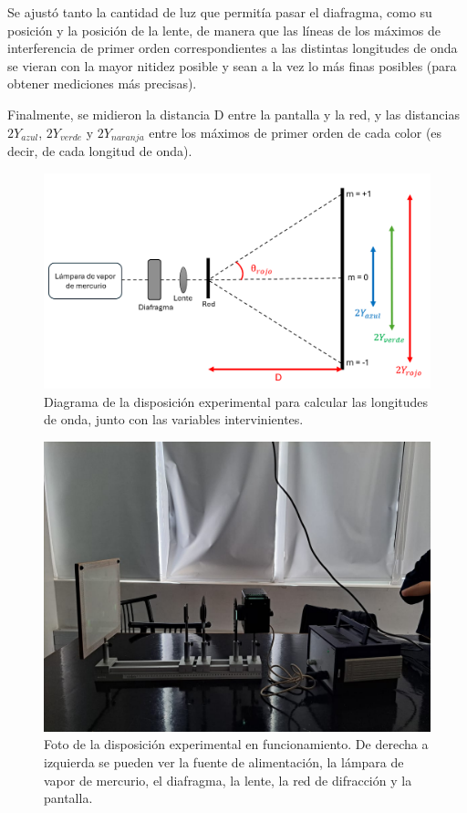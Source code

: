 \documentclass[12pt, a4paper]{article}
\begin{document}
Se ajustó tanto la cantidad de luz que permitía pasar el diafragma, como su posición y la posición de la lente, de manera que las líneas de 
los máximos de interferencia de primer orden correspondientes a las distintas longitudes de onda se vieran con la mayor nitidez posible y 
sean a la vez lo más finas posibles (para obtener mediciones más precisas). 

Finalmente, se midieron la distancia D entre la pantalla y la red, y las distancias $2Y_{azul}$, $2Y_{verde}$ y $2Y_{naranja}$ entre los 
máximos de primer orden de cada color (es decir, de cada longitud de onda).

\begin{figure}[!h] 
        \centering \includegraphics[width=0.9\columnwidth]{figures/diagramaExperimental2.png}
        \caption{\label{fig2}Diagrama de la disposición experimental para calcular las longitudes de onda, junto con las variables 
        intervinientes.}
\end{figure}

\begin{figure}[!h] 
        \centering \includegraphics[width=0.75\columnwidth]{figures/dispositivo3.jpg}
        \caption{\label{fig3}Foto de la disposición experimental en funcionamiento. De derecha a izquierda se pueden ver la fuente de 
        alimentación, la lámpara de vapor de mercurio, el diafragma, la lente, la red de difracción y la pantalla.}
\end{figure}
\end{document}
